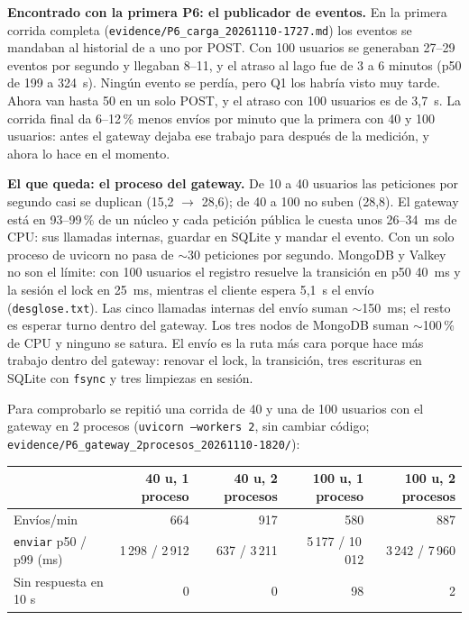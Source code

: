 \documentclass[10pt,letterpaper]{article}
\newcommand{\ev}[1]{{\footnotesize\texttt{evidence/\allowbreak #1}}}
\begin{document}
\textbf{Encontrado con la primera P6: el publicador de eventos.} En la primera corrida completa
(\ev{P6\_carga\_20261110-1727.md}) los eventos se mandaban al historial de a uno por POST. Con 100 usuarios
se generaban 27--29 eventos por segundo y llegaban 8--11, y el atraso al lago fue de 3 a 6 minutos (p50 de
199 a 324~s). Ningún evento se perdía, pero Q1 los habría visto muy tarde. Ahora van hasta 50 en un solo
POST, y el atraso con 100 usuarios es de 3,7~s. La corrida final da 6--12\,\% menos envíos por minuto que la
primera con 40 y 100 usuarios: antes el gateway dejaba ese trabajo para después de la medición, y ahora lo
hace en el momento.

\textbf{El que queda: el proceso del gateway.} De 10 a 40 usuarios las peticiones por segundo casi se
duplican (15,2 $\rightarrow$ 28,6); de 40 a 100 no suben (28,8). El gateway está en 93--99\,\% de un núcleo
y cada petición pública le cuesta unos 26--34~ms de CPU: sus llamadas internas, guardar en SQLite y mandar el
evento. Con un solo proceso de uvicorn no pasa de $\sim$30 peticiones por segundo. MongoDB y Valkey no son el
límite: con 100 usuarios el registro resuelve la transición en p50 40~ms y la sesión el lock en 25~ms,
mientras el cliente espera 5,1~s el envío (\texttt{desglose.txt}). Las cinco llamadas internas del envío
suman $\sim$150~ms; el resto es esperar turno dentro del gateway. Los tres nodos de MongoDB suman
$\sim$100\,\% de CPU y ninguno se satura. El envío es la ruta más cara porque hace más trabajo dentro del
gateway: renovar el lock, la transición, tres escrituras en SQLite con \texttt{fsync} y tres limpiezas en
sesión.

Para comprobarlo se repitió una corrida de 40 y una de 100 usuarios con el gateway en 2 procesos
(\texttt{uvicorn --workers 2}, sin cambiar código; \ev{P6\_gateway\_2procesos\_20261110-1820/}):

\begin{center}\small
\begin{tabular}{@{}lrrrr@{}}
\toprule
 & 40 u, 1 proceso & 40 u, 2 procesos & 100 u, 1 proceso & 100 u, 2 procesos \\
\midrule
Envíos/min & 664 & 917 & 580 & 887 \\
\texttt{enviar} p50 / p99 (ms) & 1\,298 / 2\,912 & 637 / 3\,211 & 5\,177 / 10\,012 & 3\,242 / 7\,960 \\
Sin respuesta en 10 s & 0 & 0 & 98 & 2 \\
\bottomrule
\end{tabular}
\end{center}
\end{document}
